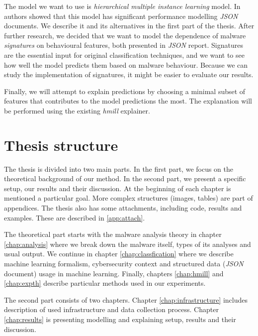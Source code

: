 The model we want to use is \emph{hierarchical multiple instance learning} model. In \cite{Mandlik2020} authors showed that this model has significant performance modelling \emph{JSON} documents. We describe it and its alternatives in the first part of the thesis. After further research, we decided that we want to model the dependence of malware \emph{signatures} on behavioural features, both presented in \emph{JSON} report. Signatures are the essential input for original classification techniques, and we want to see how well the model predicts them based on malware behaviour. Because we can study the implementation of signatures, it might be easier to evaluate our results.

Finally, we will attempt to explain predictions by choosing a minimal subset of features that contributes to the model predictions the most. 
The explanation will be performed using the existing \emph{hmill} explainer.

\section*{Thesis structure}
The thesis is divided into two main parts. In the first part, we focus on the theoretical background of our method. In the second part, we present a specific setup, our results and their discussion. At the beginning of each chapter is mentioned a particular goal. More complex structures (images, tables) are part of appendices. The thesis also has some attachments, including code, results and examples. These are described in \ref{app:attach}.

The theoretical part starts with the malware analysis theory in chapter \ref{chap:analysis} where we break down the malware itself, types of its analyses and usual output. We continue in chapter \ref{chap:classfication} where we describe machine learning formalism, cybersecurity context and structured data (\emph{JSON} document) usage in machine learning. Finally, chapters \ref{chap:hmill} and \ref{chap:expth} describe particular methods used in our experiments.

The second part consists of two chapters. Chapter \ref{chap:infrastructure} includes description of used infrastructure and data collection process. Chapter \ref{chap:results} is presenting modelling and explaining setup, results and their discussion.






